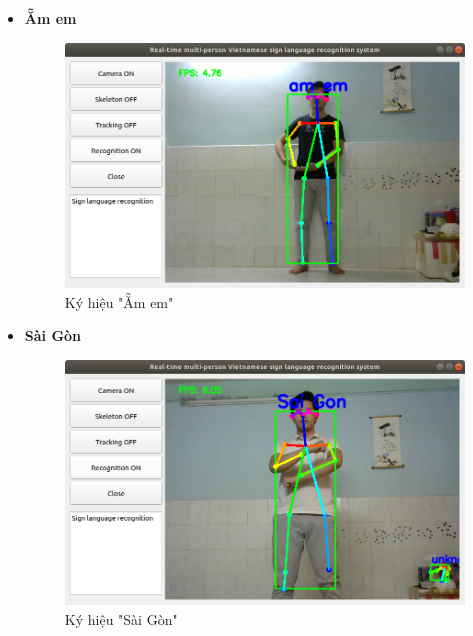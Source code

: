 \documentclass[12pt,a4paper,oneside]{book}
\numberwithin{equation}{chapter} %
\numberwithin{figure}{chapter} %
\numberwithin{table}{chapter} %
\begin{document}
\begin{itemize}
\item \textbf{Ẵm em}
\FloatBarrier
\begin{figure}[htp]
\begin{center}
\includegraphics[scale=0.4]{kq/am_em.png}
\end{center}
\caption{Ký hiệu "Ẵm em"}
\end{figure}
\FloatBarrier

\thispagestyle{phuluc}
\pagebreak
\item \textbf{Sài Gòn}
\FloatBarrier
\begin{figure}[htp]
\begin{center}
\includegraphics[scale=0.4]{kq/sai_gon.png}
\end{center}
\caption{Ký hiệu "Sài Gòn"}
\end{figure}
\FloatBarrier


\end{itemize}
\end{document}
